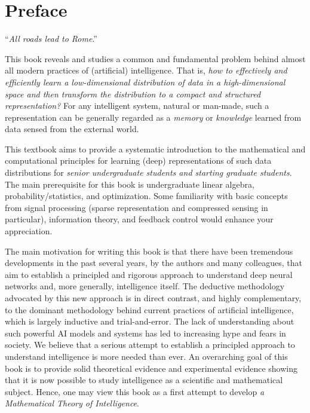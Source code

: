 \documentclass[../../book-main.tex]{subfiles}
\begin{document}
\chapter*{Preface}

\begin{center}
``{\em All roads lead to Rome}.''

\end{center}
\vspace{5mm}

This book reveals and studies a common and fundamental problem behind almost all modern practices of (artificial) intelligence. That is, {\em how to effectively and efficiently learn a low-dimensional distribution of data in a high-dimensional space and then transform the distribution to a compact and structured representation?} For any intelligent system, natural or man-made, such a representation can be generally regarded as a {\em memory} or {\em knowledge} learned from data sensed from the external world.

This textbook aims to provide a systematic introduction to the mathematical and computational principles for learning (deep) representations of such data distributions for {\em senior undergraduate students and starting graduate students}. The main prerequisite for this book is undergraduate linear algebra, probability/statistics, and optimization. Some familiarity with basic concepts from signal processing (sparse representation and compressed sensing in particular), information theory, and feedback control would enhance your appreciation. 

The main motivation for writing this book is that there have been tremendous developments in the past several years, by the authors and many colleagues, that aim to establish a principled and rigorous approach to understand deep neural networks and, more generally, intelligence itself. The deductive methodology advocated by this new approach is in direct contrast, and highly complementary, to the dominant methodology behind current practices of artificial intelligence, which is largely inductive and trial-and-error. The lack of understanding about such powerful AI models and systems has led to increasing hype and fears in society. We believe that a serious attempt to establish a principled approach to understand intelligence is more needed than ever. An overarching goal of this book is to provide solid theoretical evidence and experimental evidence showing that it is now possible to study intelligence as a scientific and mathematical subject. Hence, one may view this book as a first attempt to develop {\em a Mathematical Theory of Intelligence}.   
\end{document}
